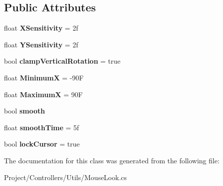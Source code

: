 \subsection*{Public Attributes}
\begin{DoxyCompactItemize}
\item 
\mbox{\label{class_unity_standard_assets_1_1_characters_1_1_first_person_1_1_mouse_look_a162641b3a40e7728efd2686c0262cea1}} 
float {\bfseries X\+Sensitivity} = 2f
\item 
\mbox{\label{class_unity_standard_assets_1_1_characters_1_1_first_person_1_1_mouse_look_a2e8ac09236a95f05a007d700e6b738e2}} 
float {\bfseries Y\+Sensitivity} = 2f
\item 
\mbox{\label{class_unity_standard_assets_1_1_characters_1_1_first_person_1_1_mouse_look_a1806245dd0c30c7e35d007f2175c2845}} 
bool {\bfseries clamp\+Vertical\+Rotation} = true
\item 
\mbox{\label{class_unity_standard_assets_1_1_characters_1_1_first_person_1_1_mouse_look_a41570eb5db78bbc956c5116c7f8aa21f}} 
float {\bfseries MinimumX} = -\/90F
\item 
\mbox{\label{class_unity_standard_assets_1_1_characters_1_1_first_person_1_1_mouse_look_a507c9acd577537937e75dc517a46ed55}} 
float {\bfseries MaximumX} = 90F
\item 
\mbox{\label{class_unity_standard_assets_1_1_characters_1_1_first_person_1_1_mouse_look_a34ecc273f7a591452675773660e5f461}} 
bool {\bfseries smooth}
\item 
\mbox{\label{class_unity_standard_assets_1_1_characters_1_1_first_person_1_1_mouse_look_ae2b9b2b8edb6f4d403c2fdc64a85076b}} 
float {\bfseries smooth\+Time} = 5f
\item 
\mbox{\label{class_unity_standard_assets_1_1_characters_1_1_first_person_1_1_mouse_look_a4b0e4fcb8a49fea4ce50c282c06053e0}} 
bool {\bfseries lock\+Cursor} = true
\end{DoxyCompactItemize}


The documentation for this class was generated from the following file\+:\begin{DoxyCompactItemize}
\item 
Project/\+Controllers/\+Utils/Mouse\+Look.\+cs\end{DoxyCompactItemize}
